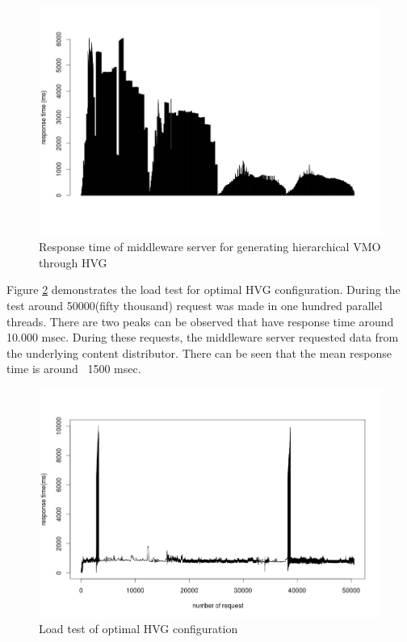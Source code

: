 \begin{figure}[h]
    \centering
    \includegraphics[width=\textwidth]{images/vmo_hvg.png}
    \caption{Response time of middleware server for generating hierarchical VMO through HVG}
    \label{fig:vmo_hvg}
\end{figure}

Figure \ref{fig:hvg_loadtest} demonstrates the load test for optimal HVG configuration. During the test around 50000(fifty thousand) request was made in one hundred parallel threads. There are two peaks can be observed that have response time around 10.000 msec. During these requests, the middleware server requested data from the underlying content distributor. There can be seen that the mean response time is around ~1500 msec.


\begin{figure}[h]
    \centering
    \includegraphics[width=\textwidth]{images/hql_loadtest.png}
    \caption{Load test of optimal HVG configuration}
    \label{fig:hvg_loadtest}
\end{figure}

